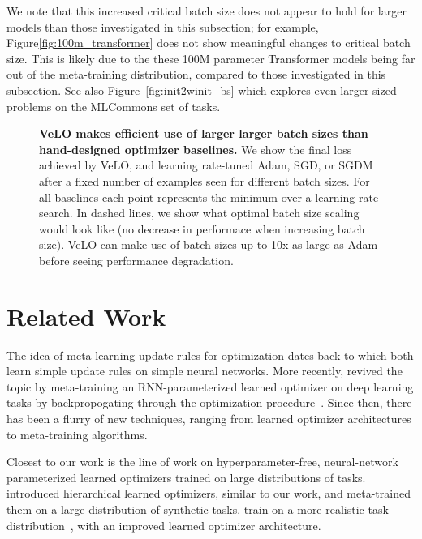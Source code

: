 \documentclass[11pt]{article}
\begin{document}
We note that this increased critical batch size does not appear to hold for larger models than those investigated in this subsection; for example, Figure\ref{fig:100m_transformer} does not show meaningful changes to critical batch size. This is likely due to the these 100M parameter Transformer models being far out of the meta-training distribution, compared to those investigated in this subsection. 
See also Figure~\ref{fig:init2winit_bs} which explores even larger sized problems on the MLCommons set of tasks.
\begin{figure}
    \centering
    \caption{\textbf{VeLO makes efficient use of larger larger batch sizes than hand-designed optimizer baselines.} We show the final loss achieved by VeLO, and learning rate-tuned Adam, SGD, or SGDM after a fixed number of examples seen for different batch sizes.
    For all baselines each point represents the minimum over a learning rate search.
    In dashed lines, we show what optimal batch size scaling would look like (no decrease in performace when increasing batch size).
    VeLO can make use of batch sizes up to 10x as large as Adam before seeing performance degradation.
    \label{fig:bs_scaling}
    }
\end{figure}


\section{Related Work}
The idea of meta-learning update rules for optimization dates back to \citet{bengio1992optimization, runarsson2000evolution} which both learn simple update rules on simple neural networks.
More recently, \citet{andrychowicz2016learning} revived the topic by meta-training an RNN-parameterized learned optimizer on deep learning tasks by backpropogating through the optimization procedure~\citep{maclaurin2015gradient}.
Since then, there has been a flurry of new techniques, ranging from learned optimizer architectures to meta-training algorithms.

Closest to our work is the line of work on hyperparameter-free, neural-network parameterized learned optimizers trained on large distributions of tasks.
\citet{wichrowska2017learned} introduced hierarchical learned optimizers, similar to our work, and meta-trained them on a large distribution of synthetic tasks.
\citet{metz2020tasks} train on a more realistic task distribution~\citep{metz2020using}, with an improved learned optimizer architecture.
\end{document}
